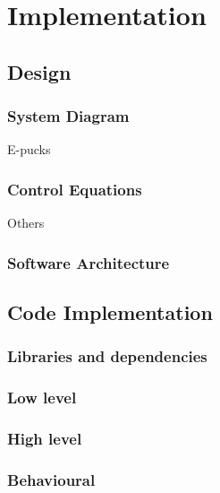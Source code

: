 \chapter{Implementation}
\label{chap:Implementation}

\section{Design}

\subsection{System Diagram}
E-pucks
\subsection{Control Equations}
Others

\subsection{Software Architecture}

\section{Code Implementation}

\subsection{Libraries and dependencies}

\subsection{Low level}

\subsection{High level}

\subsection{Behavioural}